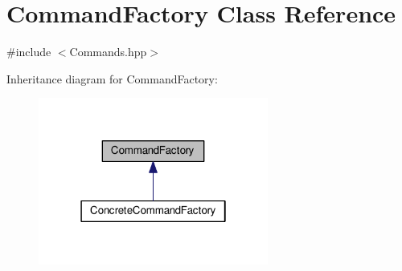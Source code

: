 \hypertarget{classCommandFactory}{}\section{Command\+Factory Class Reference}
\label{classCommandFactory}


{\ttfamily \#include $<$Commands.\+hpp$>$}



Inheritance diagram for Command\+Factory\+:\nopagebreak
\begin{figure}[H]
\begin{center}
\leavevmode
\includegraphics[width=214pt]{classCommandFactory__inherit__graph}
\end{center}
\end{figure}
